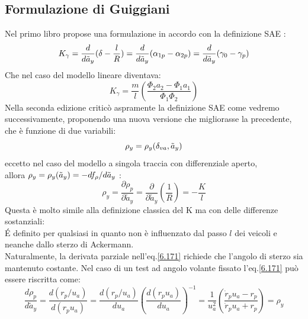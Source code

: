 \subsection{Formulazione di Guiggiani}
Nel primo libro \cite{guiggiani2007dinamica} propose una formulazione in accordo con la definizione SAE \cite{J266_201811}:\\
\begin{equation}
    K_{\gamma} = \frac{d}{d\Tilde{a}_y} (\delta - \frac{l}{R}) = \frac{d}{d\Tilde{a}_y} (\alpha_{1p} - \alpha_{2p}) = \frac{d}{d\Tilde{a}_y} (\gamma_0 - \gamma_p)
\end{equation}
Che nel caso del modello lineare diventava:\\
\begin{equation}
    K_{\gamma} = \frac{m}{l}( \frac{\Phi_2 a_2 - \Phi_1 a_1}{\Phi_1 \Phi_2})
\end{equation}
Nella seconda edizione \cite{guiggiani2018science} criticò aspramente la definizione SAE come vedremo successivamente,
proponendo una nuova versione che migliorasse la precedente, che è funzione di due variabili:\\
\begin{equation} \label{roy 1}
    \rho_y = \rho_y(\delta_{va},\Tilde{a}_y)
\end{equation}
eccetto nel caso del modello a singola traccia con differenziale aperto,\\
allora $\rho_y = \rho_y (\Tilde{a}_y) = - df_{\rho}/d\Tilde{a}_y $ :
\begin{equation} \label{6.171}
    \rho_y = \frac{\partial \rho_p}{\partial \tilde{a}_y} = \frac{\partial}{\partial \tilde{a}_y} (\frac{1}{R}) = -\frac{K}{l}
\end{equation}
Questa è molto simile alla definizione classica del K ma con delle differenze sostanziali:\\
\'E definito per qualsiasi in quanto non è influenzato dal passo $l$ dei veicoli e neanche dallo sterzo di Ackermann.\\
Naturalmente, la derivata parziale nell'eq.\ref{6.171} richiede che l'angolo di sterzo sia mantenuto costante.
Nel caso di un test ad angolo volante fissato l'eq.\ref{6.171} può essere riscritta come:\\
\begin{equation}
    \frac{d\rho_p}{d\tilde{a}_y} = \frac{d(r_p/u_a)}{d(r_pu_a)} = \frac{d(r_p/u_a)}{du_a} (\frac{d(r_pu_a)}{du_a})^{-1} = \frac{1}{u_a^2} (\frac{\dot r_pu_a - r_p}{\dot r_pu_a + r_p}) = \rho_y
\end{equation}


